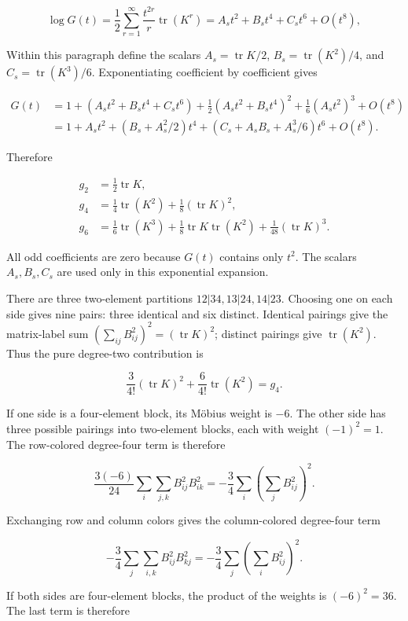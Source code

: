 \documentclass[11pt,a4paper]{article}
\begin{document}
\[
\log G(t)=\frac12\sum_{r=1}^{\infty}\frac{t^{2r}}r\operatorname{tr}(K^r)
=A_st^2+B_st^4+C_st^6+O(t^8),
\]

Within this paragraph define the scalars \(A_s=\operatorname{tr}K/2\), \(B_s=\operatorname{tr}(K^2)/4\), and \(C_s=\operatorname{tr}(K^3)/6\). Exponentiating coefficient by coefficient gives

\[
\begin{aligned}
G(t)
&=1+(A_st^2+B_st^4+C_st^6)
+\frac12(A_st^2+B_st^4)^2+\frac16(A_st^2)^3+O(t^8)\\
&=1+A_st^2+(B_s+A_s^2/2)t^4
+(C_s+A_sB_s+A_s^3/6)t^6+O(t^8).
\end{aligned}
\]

Therefore

\[
\begin{aligned}
g_2&=\tfrac12\operatorname{tr}K,\\
g_4&=\tfrac14\operatorname{tr}(K^2)+\tfrac18(\operatorname{tr}K)^2,\\
g_6&=\tfrac16\operatorname{tr}(K^3)
+\tfrac18\operatorname{tr}K\operatorname{tr}(K^2)
+\tfrac1{48}(\operatorname{tr}K)^3.
\end{aligned}
\]

All odd coefficients are zero because \(G(t)\) contains only \(t^2\). The scalars \(A_s,B_s,C_s\) are used only in this exponential expansion.

There are three two-element partitions \(12|34,13|24,14|23\). Choosing one on each side gives nine pairs: three identical and six distinct. Identical pairings give the matrix-label sum \((\sum_{ij}B_{ij}^2)^2=(\operatorname{tr}K)^2\); distinct pairings give \(\operatorname{tr}(K^2)\). Thus the pure degree-two contribution is

\[
\frac3{4!}(\operatorname{tr}K)^2+\frac6{4!}\operatorname{tr}(K^2)=g_4.
\]

If one side is a four-element block, its Möbius weight is \(-6\). The other side has three possible pairings into two-element blocks, each with weight \((-1)^2=1\). The row-colored degree-four term is therefore

\[
\frac{3(-6)}{24}\sum_i\sum_{j,k}B_{ij}^2B_{ik}^2
=-\frac34\sum_i\left(\sum_jB_{ij}^2\right)^2.
\]

Exchanging row and column colors gives the column-colored degree-four term

\[
-\frac34\sum_j\sum_{i,k}B_{ij}^2B_{kj}^2
=-\frac34\sum_j\left(\sum_iB_{ij}^2\right)^2.
\]

If both sides are four-element blocks, the product of the weights is \((-6)^2=36\). The last term is therefore
\end{document}
